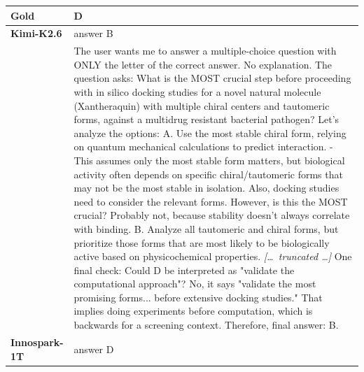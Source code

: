 \begin{longtable}{@{}l p{12.5cm}@{}}
  \textbf{Gold} & D \\
  \midrule
  \textbf{Kimi-K2.6} & answer B \\
  & The user wants me to answer a multiple-choice question with ONLY the letter of the correct answer. No explanation. \newline The question asks: What is the MOST crucial step before proceeding with in silico docking studies for a novel natural molecule (Xantheraquin) with multiple chiral centers and tautomeric forms, against a multidrug resistant bacterial pathogen? \newline Let's analyze the options: \newline A. Use the most stable chiral form, relying on quantum mechanical calculations to predict interaction. \newline - This assumes only the most stable form matters, but biological activity often depends on specific chiral/tautomeric forms that may not be the most stable in isolation. Also, docking studies need to consider the relevant forms. However, is this the MOST crucial? Probably not, because stability doesn't always correlate with binding. \newline B. Analyze all tautomeric and chiral forms, but prioritize those forms that are most likely to be biologically active based on physicochemical properties. \newline \textit{[\ldots\ truncated \ldots]} \newline One final check: Could D be interpreted as "validate the computational approach"? No, it says "validate the most promising forms... before extensive docking studies." That implies doing experiments before computation, which is backwards for a screening context. \newline Therefore, final answer: B. \\
  \textbf{Innospark-1T} & answer D \\

\end{longtable}

